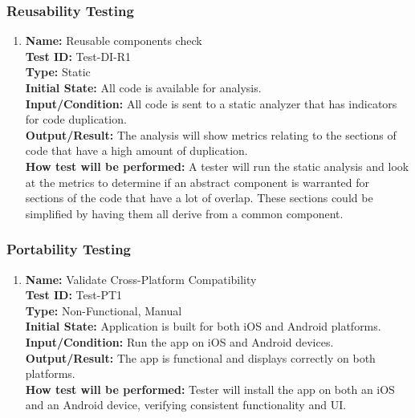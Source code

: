 \documentclass[12pt, titlepage]{article}
\begin{document}
\begin{enumerate}
\begin{enumerate}
\end{enumerate}

\subsubsection{Reusability Testing}

\begin{enumerate}

    \item
    \textbf{Name:} Reusable components check \label{itm:Test-DI-R1} \\
    \textbf{Test ID:} Test-DI-R1 \\
    \textbf{Type:} Static \\
    \textbf{Initial State:} All code is available for analysis. \\
    \textbf{Input/Condition:} All code is sent to a static analyzer that has indicators for code duplication. \\
    \textbf{Output/Result:} The analysis will show metrics relating to the sections of code that have a high amount of duplication. \\
    \textbf{How test will be performed:} A tester will run the static analysis and look at the metrics to determine if an abstract component is warranted for sections of the code that have a lot of overlap. These sections could be simplified by having them all derive from a common component.

\end{enumerate}


\subsubsection{Portability Testing}

\begin{enumerate}

    \item \textbf{Name:} Validate Cross-Platform Compatibility \label{itm:Test-PT1} \\
    \textbf{Test ID:} Test-PT1 \\
    \textbf{Type:} Non-Functional, Manual \\
    \textbf{Initial State:} Application is built for both iOS and Android platforms. \\
    \textbf{Input/Condition:} Run the app on iOS and Android devices. \\
    \textbf{Output/Result:} The app is functional and displays correctly on both platforms. \\
    \textbf{How test will be performed:} Tester will install the app on both an iOS and an Android device, verifying consistent functionality and UI.


\end{enumerate}
\end{enumerate}
\end{document}
